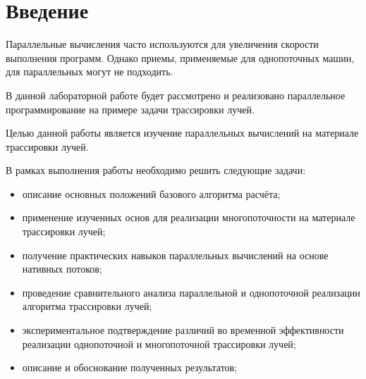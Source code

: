 \chapter*{Введение}

Параллельные вычисления часто используются для увеличения скорости выполнения программ. Однако приемы, применяемые для однопоточных машин, для параллельных могут не подходить.

В данной лабораторной работе будет рассмотрено и реализовано параллельное программирование на примере задачи трассировки лучей.

Целью данной работы является изучение параллельных вычислений на материале трассировки лучей.

В рамках выполнения работы необходимо решить следующие задачи:
\begin{itemize}[label=---]
	\item описание основных положений базового алгоритма расчёта;
	\item применение изученных основ для реализации многопоточности на материале трассировки лучей;
	\item получение практических навыков параллельных вычислений на основе нативных потоков;
	\item проведение сравнительного анализа параллельной и однопоточной реализации алгоритма трассировки лучей;
	\item экспериментальное подтверждение различий во временной эффективности реализации однопоточной и многопоточной трассировки лучей;
	\item описание и обоснование полученных результатов;
\end{itemize}
